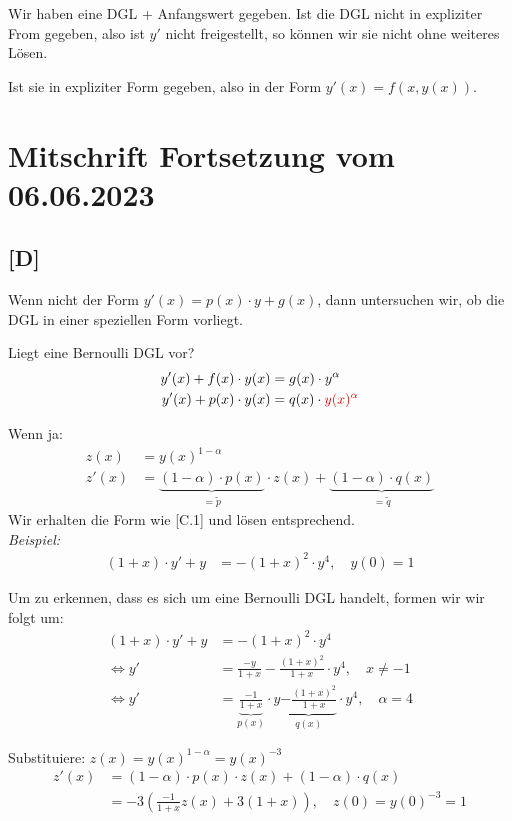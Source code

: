 \documentclass[main.tex]{subfiles}
\begin{document}
Wir haben eine DGL + Anfangswert gegeben. 
Ist die DGL nicht in expliziter From gegeben, also ist $y'$ nicht freigestellt, so können wir sie nicht ohne weiteres Lösen. 

Ist sie in expliziter Form gegeben, also in der Form $y'(x) = f(x,y(x))$. 


\section{Mitschrift Fortsetzung vom 06.06.2023}

\subsection{[D]}
Wenn nicht der Form $y'(x) = p(x)\cdot y + g(x)$, dann untersuchen wir, ob die DGL in einer speziellen Form vorliegt.

Liegt eine Bernoulli DGL vor?
\begin{align*}
	y'(x) + f(x)\cdot y(x) &= g(x)\cdot y^\alpha \\
	y'(x) + p(x)\cdot y(x) &= q(x)\cdot \textcolor{red}{y(x)^\alpha}
\end{align*}

Wenn ja: 
\begin{align*}
	z(x)  &= y(x)^{1-\alpha} \\
	z'(x) &= \underbrace{(1-\alpha)\cdot p(x)}_{= \tilde{p}}\cdot z(x) + \underbrace{(1-\alpha)\cdot q(x)}_{= \tilde{q}}	
\end{align*}
Wir erhalten die Form wie [C.1] und lösen entsprechend.\\

\textit{Beispiel:}
\begin{align*}
	(1+x)\cdot y' + y &= - (1+x)^2\cdot y^4, \quad y(0) = 1
\end{align*}

Um zu erkennen, dass es sich um eine Bernoulli DGL handelt, formen wir wir folgt um: 
\begin{align*}
	(1+x)\cdot y' + y &= - (1+x)^2\cdot y^4 \\
\Leftrightarrow	y' &= \frac{-y}{1+x} - \frac{(1+x)^2}{1+x} \cdot y^4, \quad x\neq -1 \\
\Leftrightarrow	y' &= \underbrace{\frac{-1}{1+x}}_{p(x)} \cdot y \underbrace{- \frac{(1+x)^2}{1+x}}_{q(x)} \cdot y^4, \quad \alpha = 4
\end{align*}

Substituiere: $z(x) = y(x)^{1-\alpha} = y(x)^{-3}$
\begin{align*}
	z'(x) &= (1-\alpha)\cdot p(x) \cdot z(x) + (1-\alpha)\cdot q(x)\\
		  &= -3(\frac{-1}{1+x} z(x) +3 (1+x)), \quad z(0)=y(0)^{-3}=1
\end{align*}
\end{document}
